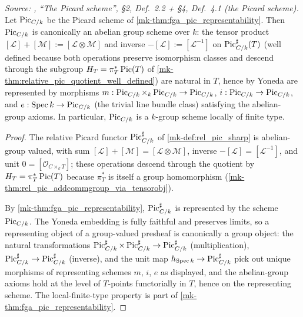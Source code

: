 \begin{theorem}\label{mk-thm:pic_is_group_scheme}
  \leanok

  \textit{Source: \cite{kleiman-picard}, ``The Picard scheme'', \S 2, Def.~2.2 +
  \S 4, Def.~4.1 (the Picard scheme).}
  Let \(\operatorname{Pic}_{C/k}\) be the Picard scheme of
  \ref{mk-thm:fga_pic_representability}. Then \(\operatorname{Pic}_{C/k}\) is canonically an
  abelian group scheme over \(k\): the tensor product
  \([\mathcal{L}] + [\mathcal{M}] := [\mathcal{L} \otimes \mathcal{M}]\)
  and inverse \(-[\mathcal{L}] := [\mathcal{L}^{-1}]\) on
  \(\operatorname{Pic}^\sharp_{C/k}(T)\) (well defined because both operations
  preserve isomorphism classes and descend through the subgroup
  \(H_T = \pi_T^*\operatorname{Pic}(T)\) of \ref{mk-thm:relative_pic_quotient_well_defined})
  are natural in \(T\), hence by Yoneda are represented by morphisms
  \(m : \operatorname{Pic}_{C/k} \times_k \operatorname{Pic}_{C/k} \to \operatorname{Pic}_{C/k}\),
  \(i : \operatorname{Pic}_{C/k} \to \operatorname{Pic}_{C/k}\), and
  \(e : \operatorname{Spec} k \to \operatorname{Pic}_{C/k}\) (the trivial line bundle class) satisfying
  the abelian-group axioms. In particular, \(\operatorname{Pic}_{C/k}\) is a \(k\)-group
  scheme locally of finite type.
\end{theorem}

\begin{proof}
  \leanok
The relative Picard functor \(\operatorname{Pic}^\sharp_{C/k}\) of
  \ref{mk-def:rel_pic_sharp} is abelian-group valued, with sum
  \([\mathcal{L}] + [\mathcal{M}] = [\mathcal{L} \otimes \mathcal{M}]\),
  inverse \(-[\mathcal{L}] = [\mathcal{L}^{-1}]\), and unit
  \(0 = [\mathcal{O}_{C \times_k T}]\); these operations descend through
  the quotient by \(H_T = \pi_T^*\operatorname{Pic}(T)\) because \(\pi_T^*\) is itself a
  group homomorphism (\ref{mk-thm:rel_pic_addcommgroup_via_tensorobj}).

  By \ref{mk-thm:fga_pic_representability}, \(\operatorname{Pic}^\sharp_{C/k}\) is
  represented by the scheme \(\operatorname{Pic}_{C/k}\). The Yoneda embedding is fully
  faithful and preserves limits, so a representing object of a
  group-valued presheaf is canonically a group object: the natural
  transformations
  $\operatorname{Pic}^\sharp_{C/k} \times \operatorname{Pic}^\sharp_{C/k} \to \operatorname{Pic}^\sharp_{C/k}$
  (multiplication), \(\operatorname{Pic}^\sharp_{C/k} \to \operatorname{Pic}^\sharp_{C/k}\) (inverse),
  and the unit map \(h_{\operatorname{Spec} k} \to \operatorname{Pic}^\sharp_{C/k}\) pick out unique
  morphisms of representing schemes \(m\), \(i\), \(e\) as displayed, and
  the abelian-group axioms hold at the level of \(T\)-points functorially
  in \(T\), hence on the representing scheme. The local-finite-type
  property is part of \ref{mk-thm:fga_pic_representability}.
\end{proof}

